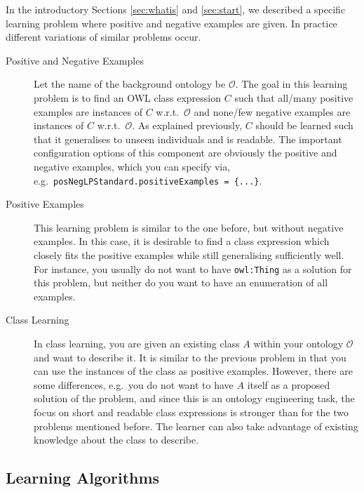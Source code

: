 \documentclass[a4paper,12pt]{scrartcl}
\begin{document}
In the introductory Sections \ref{sec:whatis} and \ref{sec:start}, we described a specific learning problem where positive and negative examples are given. In practice different variations of similar problems occur. 

\begin{description}
 \item[Positive and Negative Examples] Let the name of the background ontology be $\mathcal{O}$. The goal in this learning problem is to find an OWL class expression $C$ such that all/many positive examples are instances of $C$ w.r.t.~$\mathcal{O}$ and none/few negative examples are instances of $C$ w.r.t.~$\mathcal{O}$. As explained previously, $C$ should be learned such that it generalises to unseen individuals and is readable. The important configuration options of this component are obviously the positive and negative examples, which you can specify via, e.g.~\texttt{\small posNegLPStandard.positiveExamples = \{...\}}.
 \item[Positive Examples] This learning problem is similar to the one before, but without negative examples. In this case, it is desirable to find a class expression which closely fits the positive examples while still generalising sufficiently well. For instance, you usually do not want to have \verb|owl:Thing| as a solution for this problem, but neither do you want to have an enumeration of all examples.
 \item[Class Learning] In class learning, you are given an existing class $A$ within your ontology $\mathcal{O}$ and want to describe it. It is similar to the previous problem in that you can use the instances of the class as positive examples. However, there are some differences, e.g.~you do not want to have $A$ itself as a proposed solution of the problem, and since this is an ontology engineering task, the focus on short and readable class expressions is stronger than for the two problems mentioned before. The learner can also take advantage of existing knowledge about the class to describe.
\end{description}

\subsection{Learning Algorithms}
\end{document}
